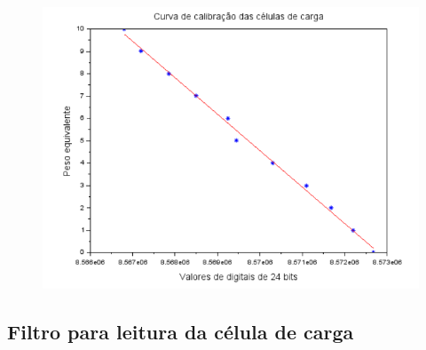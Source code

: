 \begin{figure}[!h]
\centering \includegraphics[scale=0.7]{figuras/calibracao_celula_de_carga}
\label{calibracaocelula}
\end{figure}

\pagebreak

\subsection{Filtro para leitura da célula de carga}

